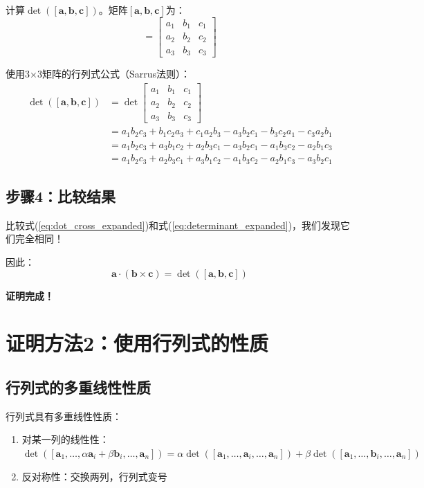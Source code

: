 \documentclass[12pt,a4paper]{article}
\begin{document}
计算$\det([\bm{a}, \bm{b}, \bm{c}])$。矩阵$[\bm{a}, \bm{b}, \bm{c}]$为：
\begin{equation}
[\bm{a}, \bm{b}, \bm{c}] = \begin{bmatrix} a_1 & b_1 & c_1 \\ a_2 & b_2 & c_2 \\ a_3 & b_3 & c_3 \end{bmatrix}
\end{equation}

使用3×3矩阵的行列式公式（Sarrus法则）：
\begin{align}
\det([\bm{a}, \bm{b}, \bm{c}]) &= \det\begin{bmatrix} a_1 & b_1 & c_1 \\ a_2 & b_2 & c_2 \\ a_3 & b_3 & c_3 \end{bmatrix} \\
&= a_1 b_2 c_3 + b_1 c_2 a_3 + c_1 a_2 b_3 - a_3 b_2 c_1 - b_3 c_2 a_1 - c_3 a_2 b_1 \\
&= a_1 b_2 c_3 + a_3 b_1 c_2 + a_2 b_3 c_1 - a_3 b_2 c_1 - a_1 b_3 c_2 - a_2 b_1 c_3 \\
&= a_1 b_2 c_3 + a_2 b_3 c_1 + a_3 b_1 c_2 - a_1 b_3 c_2 - a_2 b_1 c_3 - a_3 b_2 c_1
\label{eq:determinant_expanded}
\end{align}

\subsection{步骤4：比较结果}

比较式(\ref{eq:dot_cross_expanded})和式(\ref{eq:determinant_expanded})，我们发现它们完全相同！

因此：
\begin{equation}
\bm{a} \cdot (\bm{b} \times \bm{c}) = \det([\bm{a}, \bm{b}, \bm{c}])
\end{equation}

\textbf{证明完成！}

\section{证明方法2：使用行列式的性质}

\subsection{行列式的多重线性性质}

行列式具有多重线性性质：
\begin{enumerate}
\item 对某一列的线性性：$\det([\bm{a}_1, \ldots, \alpha \bm{a}_i + \beta \bm{b}_i, \ldots, \bm{a}_n]) = \alpha \det([\bm{a}_1, \ldots, \bm{a}_i, \ldots, \bm{a}_n]) + \beta \det([\bm{a}_1, \ldots, \bm{b}_i, \ldots, \bm{a}_n])$
\item 反对称性：交换两列，行列式变号
\end{enumerate}
\end{document}
